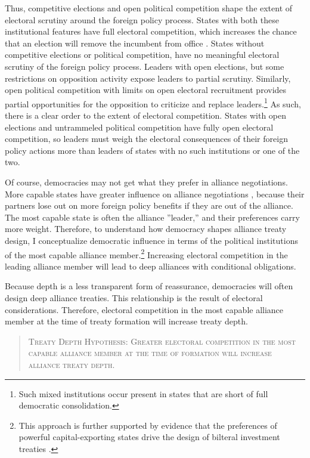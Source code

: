 \documentclass[12pt]{article}
\begin{document}
Thus, competitive elections and open political competition shape the extent of electoral scrutiny around the foreign policy process.
States with both these institutional features have full electoral competition, which increases the chance that an election will remove the incumbent from office \citep{HydeMarinov2012}. 
States without competitive elections or political competition, have no meaningful electoral scrutiny of the foreign policy process.
Leaders with open elections, but some restrictions on opposition activity expose leaders to partial scrutiny. 
Similarly, open political competition with limits on open electoral recruitment provides partial opportunities for the opposition to criticize and replace leaders.\footnote{Such mixed institutions occur present in states that are short of full democratic consolidation.}
As such, there is a clear order to the extent of electoral competition.
States with open elections and untrammeled political competition have fully open electoral competition, so leaders must weigh the electoral consequences of their foreign policy actions more than leaders of states with no such institutions or one of the two. 


Of course, democracies may not get what they prefer in alliance negotiations. 
More capable states have greater influence on alliance negotiations \citep{Mattes2012}, because their partners lose out on more foreign policy benefits if they are out of the alliance.
The most capable state is often the alliance ''leader,'' and their preferences carry more weight. 
Therefore, to understand how democracy shapes alliance treaty design, I conceptualize democratic influence in terms of the political institutions of the most capable alliance member.\footnote{This approach is further supported by evidence that the preferences of powerful capital-exporting states drive the design of bilteral investment treaties \citep{AlleePeinhardt2014}.} 
Increasing electoral competition in the leading alliance member will lead to deep alliances with conditional obligations. 


Because depth is a less transparent form of reassurance, democracies will often design deep alliance treaties. 
This relationship is the result of electoral considerations. 
Therefore, electoral competition in the most capable alliance member at the time of treaty formation will increase treaty depth. 


\begin{quote}
\textsc{Treaty Depth Hypothesis: Greater electoral competition in the most capable alliance member at the time of formation will increase alliance treaty depth.}
\end{quote}   
\end{document}
